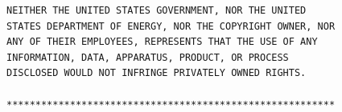 \documentclass[paper=letter]{scrartcl}
\begin{document}
\begin{Verbatim}
NEITHER THE UNITED STATES GOVERNMENT, NOR THE UNITED
STATES DEPARTMENT OF ENERGY, NOR THE COPYRIGHT OWNER, NOR
ANY OF THEIR EMPLOYEES, REPRESENTS THAT THE USE OF ANY
INFORMATION, DATA, APPARATUS, PRODUCT, OR PROCESS
DISCLOSED WOULD NOT INFRINGE PRIVATELY OWNED RIGHTS.

*********************************************************


\end{Verbatim}


\end{document}
